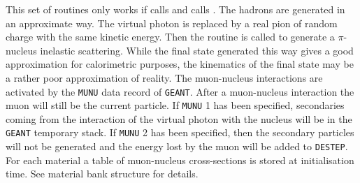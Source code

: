 This set of routines only works if  calls  and
 calls .
The hadrons are generated in an approximate way. The virtual photon is
replaced by a real pion of random charge with the same kinetic energy. Then the
 routine is called to generate a $\pi$-nucleus inelastic
scattering. While the final state generated this way gives a good
approximation for calorimetric purposes, the kinematics of the final state
may be a rather poor approximation of reality.
The muon-nucleus interactions are activated by the {\tt  MUNU} data record of
{\tt GEANT}. After a muon-nucleus interaction the muon will still be the current
particle. If {\tt MUNU} 1 has been specified, secondaries coming from the
interaction of the virtual photon with the nucleus will be in the {\tt GEANT}
temporary stack. If {\tt MUNU} 2 has been specified, then the secondary
particles will not be generated and the energy lost by the muon will be
added to {\tt DESTEP}.
For each material a table of muon-nucleus cross-sections is stored at
initialisation time. See material bank structure for details.
